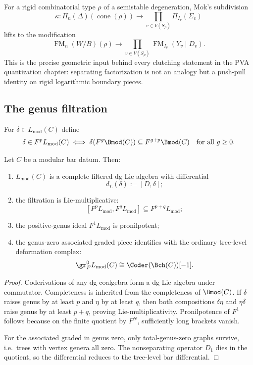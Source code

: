 \begin{remark}
\label{rem:vol2-mok-cutting-map-factorization}
For a rigid combinatorial type $\rho$ of a semistable degeneration, Mok's subdivision
\[
\kappa\colon \Pi_n(\Delta)(\operatorname{cone}(\rho))\to \prod_{v\in V(S_\rho)}\Pi_{I_v}(\Sigma_v)
\]
lifts to the modification
\[
\operatorname{FM}_n(W/B)(\rho)\to \prod_{v\in V(S_\rho)}\operatorname{FM}_{I_v}(Y_v\mathbin{|}D_v).
\]
This is the precise geometric input behind every clutching statement in the PVA quantization chapter:
separating factorization is not an analogy but a push-pull identity on rigid logarithmic boundary pieces.
\end{remark}


\subsection{The genus filtration}

\begin{definition}
For $\delta\in L_{\mathrm{mod}}(C)$ define
\[
\delta\in F^pL_{\mathrm{mod}}(C)
\iff
\delta(F^g\Bmod(C))\subseteq F^{g+p}\Bmod(C)
\quad\text{for all }g\ge 0.
\]
\end{definition}

\begin{theorem}\label{thm:formal-structure}
Let $C$ be a modular bar datum. Then:
\begin{enumerate}[leftmargin=2.4em]
\item $L_{\mathrm{mod}}(C)$ is a complete filtered dg Lie algebra with differential
\[
d_L(\delta):=[D,\delta];
\]
\item the filtration is Lie-multiplicative:
\[
[F^pL_{\mathrm{mod}},F^qL_{\mathrm{mod}}]\subseteq F^{p+q}L_{\mathrm{mod}};
\]
\item the positive-genus ideal $F^1L_{\mathrm{mod}}$ is pronilpotent;
\item the genus-zero associated graded piece identifies with the ordinary tree-level deformation complex:
\[
\gr_F^0 L_{\mathrm{mod}}(C)\cong \Coder(\Bch(C))[-1].
\]
\end{enumerate}
\end{theorem}

\begin{proof}
Coderivations of any dg coalgebra form a dg Lie algebra under commutator. Completeness
is inherited from the completeness of $\Bmod(C)$. If $\delta$ raises genus by at least $p$
and $\eta$ by at least $q$, then both compositions $\delta\eta$ and $\eta\delta$ raise genus
by at least $p+q$, proving Lie-multiplicativity. Pronilpotence of $F^1$ follows because on
the finite quotient by $F^N$, sufficiently long brackets vanish.

For the associated graded in genus zero, only total-genus-zero graphs survive, i.e.\ trees
with vertex genera all zero. The nonseparating operator $D_1$ dies in the quotient, so the
differential reduces to the tree-level bar differential.
\end{proof}

